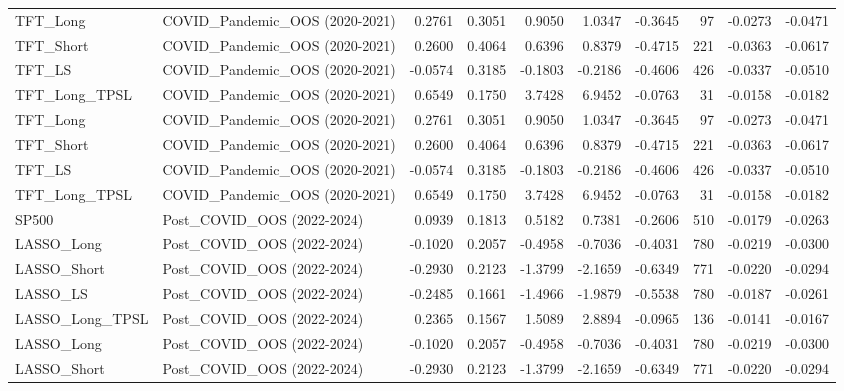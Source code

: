 \begin{tabular}{llrrrrrrrr}
\cline{1-10}
TFT\_Long & COVID\_Pandemic\_OOS (2020-2021) & 0.2761 & 0.3051 & 0.9050 & 1.0347 & -0.3645 & 97 & -0.0273 & -0.0471 \\
\cline{1-10}
TFT\_Short & COVID\_Pandemic\_OOS (2020-2021) & 0.2600 & 0.4064 & 0.6396 & 0.8379 & -0.4715 & 221 & -0.0363 & -0.0617 \\
\cline{1-10}
TFT\_LS & COVID\_Pandemic\_OOS (2020-2021) & -0.0574 & 0.3185 & -0.1803 & -0.2186 & -0.4606 & 426 & -0.0337 & -0.0510 \\
\cline{1-10}
TFT\_Long\_TPSL & COVID\_Pandemic\_OOS (2020-2021) & 0.6549 & 0.1750 & 3.7428 & 6.9452 & -0.0763 & 31 & -0.0158 & -0.0182 \\
\cline{1-10}
TFT\_Long & COVID\_Pandemic\_OOS (2020-2021) & 0.2761 & 0.3051 & 0.9050 & 1.0347 & -0.3645 & 97 & -0.0273 & -0.0471 \\
\cline{1-10}
TFT\_Short & COVID\_Pandemic\_OOS (2020-2021) & 0.2600 & 0.4064 & 0.6396 & 0.8379 & -0.4715 & 221 & -0.0363 & -0.0617 \\
\cline{1-10}
TFT\_LS & COVID\_Pandemic\_OOS (2020-2021) & -0.0574 & 0.3185 & -0.1803 & -0.2186 & -0.4606 & 426 & -0.0337 & -0.0510 \\
\cline{1-10}
TFT\_Long\_TPSL & COVID\_Pandemic\_OOS (2020-2021) & 0.6549 & 0.1750 & 3.7428 & 6.9452 & -0.0763 & 31 & -0.0158 & -0.0182 \\
\cline{1-10}
SP500 & Post\_COVID\_OOS (2022-2024) & 0.0939 & 0.1813 & 0.5182 & 0.7381 & -0.2606 & 510 & -0.0179 & -0.0263 \\
\cline{1-10}
LASSO\_Long & Post\_COVID\_OOS (2022-2024) & -0.1020 & 0.2057 & -0.4958 & -0.7036 & -0.4031 & 780 & -0.0219 & -0.0300 \\
\cline{1-10}
LASSO\_Short & Post\_COVID\_OOS (2022-2024) & -0.2930 & 0.2123 & -1.3799 & -2.1659 & -0.6349 & 771 & -0.0220 & -0.0294 \\
\cline{1-10}
LASSO\_LS & Post\_COVID\_OOS (2022-2024) & -0.2485 & 0.1661 & -1.4966 & -1.9879 & -0.5538 & 780 & -0.0187 & -0.0261 \\
\cline{1-10}
LASSO\_Long\_TPSL & Post\_COVID\_OOS (2022-2024) & 0.2365 & 0.1567 & 1.5089 & 2.8894 & -0.0965 & 136 & -0.0141 & -0.0167 \\
\cline{1-10}
LASSO\_Long & Post\_COVID\_OOS (2022-2024) & -0.1020 & 0.2057 & -0.4958 & -0.7036 & -0.4031 & 780 & -0.0219 & -0.0300 \\
\cline{1-10}
LASSO\_Short & Post\_COVID\_OOS (2022-2024) & -0.2930 & 0.2123 & -1.3799 & -2.1659 & -0.6349 & 771 & -0.0220 & -0.0294 \\

\end{tabular}
